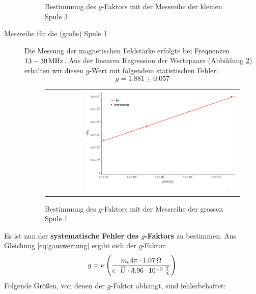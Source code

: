 \documentclass[a4paper,titlepage]{scrartcl}
\numberwithin{equation}{section}
\begin{document}
\begin{description}
\begin{figure}[H]
\begin{tabular}{@{}r@{}}
	\end{tabular}
	\caption{Bestimmung des $g$-Faktors mit der Messreihe der kleinen Spule 3}
    \label{fig:gkleine}
\end{figure}
\item[Messreihe für die (große) Spule 1] Die Messung der magnetischen Feldstärke erfolgte bei Frequenzen $\unit[13-30]{MHz}$. Aus der linearen Regression der Wertepaare (Abbildung \ref{fig:ggrosse}) erhalten wir diesen $g$-Wert mit folgendem statistischen Fehler:
\begin{equation*}
g=1.881 \pm 0.057
\end{equation*}
\begin{figure}[H]
	\centering
	\begin{tabular}{@{}r@{}}
		\includegraphics[width=0.8\textwidth]{images/ggrosse.png}\\
	\end{tabular}
	\caption{Bestimmung des $g$-Faktors mit der Messreihe der grossen Spule 1}
    \label{fig:ggrosse}
\end{figure}
\end{description}
Es ist nun der \textbf{systematische Fehler des $g$-Faktors} zu bestimmen. Aus Gleichung \ref{eq:gauswertung} ergibt sich der $g$-Faktor:
\begin{equation*}
g=\nu \left( \frac{m_e 4 \pi \cdot \unit[1.07]{\Omega}}{e \cdot \overline{U} \cdot \unit[3.96 \cdot 10^{-3}]{\frac{T}{A}}} \right)
\end{equation*}
Folgende Größen, von denen der $g$-Faktor abhängt, sind fehlerbehaftet:
\end{document}
